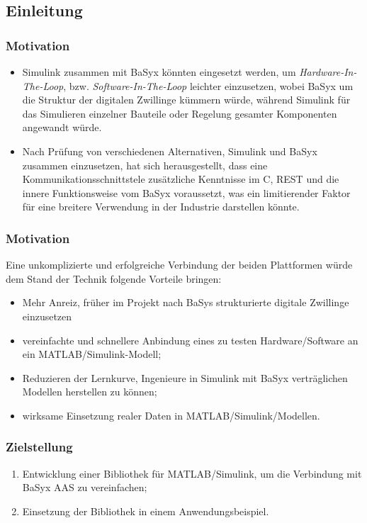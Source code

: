 \documentclass{beamer}
\begin{document}
\subsection{Einleitung}
\begin{frame}
    \frametitle{Motivation}
    \begin{itemize}
        \item Simulink zusammen mit BaSyx könnten eingesetzt werden, um \emph{Hardware-In-The-Loop}, bzw. \emph{Software-In-The-Loop} leichter einzusetzen, wobei BaSyx um die Struktur der digitalen Zwillinge kümmern würde, während Simulink für das Simulieren einzelner Bauteile oder Regelung gesamter Komponenten angewandt würde.
        \item Nach Prüfung von verschiedenen Alternativen, Simulink und BaSyx zusammen einzusetzen, hat sich herausgestellt, dass eine Kommunikationsschnittstele zusätzliche Kenntnisse im C, REST und die innere Funktionsweise vom BaSyx voraussetzt, was ein limitierender Faktor für eine breitere Verwendung in der Industrie darstellen könnte.
    \end{itemize}
\end{frame}

\begin{frame}
    \frametitle{Motivation}
    Eine unkomplizierte und erfolgreiche Verbindung der beiden Plattformen würde dem Stand der Technik folgende Vorteile bringen:
    \begin{itemize}
        \item Mehr Anreiz, früher im Projekt nach BaSys strukturierte digitale Zwillinge einzusetzen
        \item vereinfachte und schnellere Anbindung eines zu testen Hardware/Software an ein MATLAB/Simulink-Modell;
        \item Reduzieren der Lernkurve, Ingenieure in Simulink mit BaSyx verträglichen Modellen herstellen zu können;
        \item wirksame Einsetzung realer Daten in MATLAB/Simulink/Modellen.  
    \end{itemize}

\end{frame}
\begin{frame}
    \frametitle{Zielstellung}
    \begin{enumerate}
        \item Entwicklung einer Bibliothek für MATLAB/Simulink, um die Verbindung mit BaSyx AAS zu vereinfachen;
        \item Einsetzung der Bibliothek in einem Anwendungsbeispiel.
    \end{enumerate}    
\end{frame}
\end{document}
